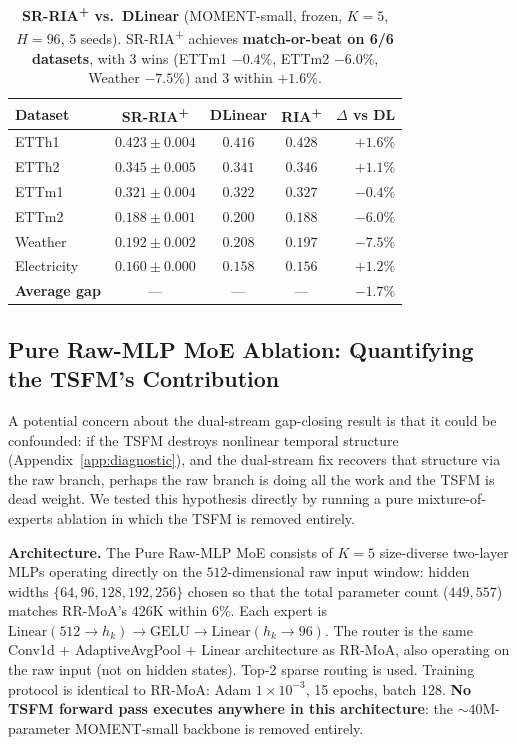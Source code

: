 \documentclass{article}
\begin{document}
\begin{table}[!htbp]
\centering
\caption{\textbf{SR-RIA\textsuperscript{+} vs.\ DLinear} (MOMENT-small, frozen, $K{=}5$, $H{=}96$, 5 seeds). SR-RIA\textsuperscript{+} achieves \textbf{match-or-beat on 6/6 datasets}, with 3 wins (ETTm1 $-0.4\%$, ETTm2 $-6.0\%$, Weather $-7.5\%$) and 3 within $+1.6\%$.}
\label{tab:sr_ria}
\small
\begin{tabular}{@{}lcccr@{}}
\toprule
Dataset & SR-RIA\textsuperscript{+} & DLinear & RIA\textsuperscript{+} & $\Delta$ vs DL \\
\midrule
ETTh1       & $0.423 \pm 0.004$ & $0.416$ & $0.428$ & $+1.6\%$ \\
ETTh2       & $0.345 \pm 0.005$ & $0.341$ & $0.346$ & $+1.1\%$ \\
ETTm1       & $\mathbf{0.321 \pm 0.004}$ & $0.322$ & $0.327$ & $\mathbf{-0.4\%}$ \\
ETTm2       & $\mathbf{0.188 \pm 0.001}$ & $0.200$ & $0.188$ & $\mathbf{-6.0\%}$ \\
Weather     & $\mathbf{0.192 \pm 0.002}$ & $0.208$ & $0.197$ & $\mathbf{-7.5\%}$ \\
Electricity & $0.160 \pm 0.000$ & $0.158$ & $0.156$ & $+1.2\%$ \\
\midrule
\textbf{Average gap} & --- & --- & --- & $\mathbf{-1.7\%}$ \\
\bottomrule
\end{tabular}
\end{table}

\subsection{Pure Raw-MLP MoE Ablation: Quantifying the TSFM's Contribution}
\label{app:raw_mlp_moe}

A potential concern about the dual-stream gap-closing result is that it could be confounded: if the TSFM destroys nonlinear temporal structure (Appendix~\ref{app:diagnostic}), and the dual-stream fix recovers that structure via the raw branch, perhaps the raw branch is doing all the work and the TSFM is dead weight. We tested this hypothesis directly by running a pure mixture-of-experts ablation in which the TSFM is removed entirely.

\textbf{Architecture.} The Pure Raw-MLP MoE consists of $K{=}5$ size-diverse two-layer MLPs operating directly on the $512$-dimensional raw input window: hidden widths $\{64, 96, 128, 192, 256\}$ chosen so that the total parameter count ($449{,}557$) matches RR-MoA's $426$K within $6\%$. Each expert is $\text{Linear}(512{\to}h_k) \to \text{GELU} \to \text{Linear}(h_k{\to}96)$. The router is the same Conv1d $+$ AdaptiveAvgPool $+$ Linear architecture as RR-MoA, also operating on the raw input (not on hidden states). Top-2 sparse routing is used. Training protocol is identical to RR-MoA: Adam $1{\times}10^{-3}$, 15 epochs, batch 128. \textbf{No TSFM forward pass executes anywhere in this architecture}: the ${\sim}40$M-parameter MOMENT-small backbone is removed entirely.
\end{document}
